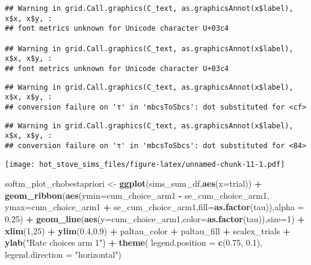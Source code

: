 \documentclass[
]{article}
\newenvironment{Shaded}{\begin{snugshade}}{\end{snugshade}}
\newcommand{\AttributeTok}[1]{\textcolor[rgb]{0.13,0.29,0.53}{#1}}
\newcommand{\DecValTok}[1]{\textcolor[rgb]{0.00,0.00,0.81}{#1}}
\newcommand{\FloatTok}[1]{\textcolor[rgb]{0.00,0.00,0.81}{#1}}
\newcommand{\FunctionTok}[1]{\textcolor[rgb]{0.13,0.29,0.53}{\textbf{#1}}}
\newcommand{\NormalTok}[1]{#1}
\newcommand{\OtherTok}[1]{\textcolor[rgb]{0.56,0.35,0.01}{#1}}
\newcommand{\SpecialCharTok}[1]{\textcolor[rgb]{0.81,0.36,0.00}{\textbf{#1}}}
\newcommand{\StringTok}[1]{\textcolor[rgb]{0.31,0.60,0.02}{#1}}
\begin{document}
\begin{verbatim}
## Warning in grid.Call.graphics(C_text, as.graphicsAnnot(x$label), x$x, x$y, :
## font metrics unknown for Unicode character U+03c4

## Warning in grid.Call.graphics(C_text, as.graphicsAnnot(x$label), x$x, x$y, :
## font metrics unknown for Unicode character U+03c4
\end{verbatim}

\begin{verbatim}
## Warning in grid.Call.graphics(C_text, as.graphicsAnnot(x$label), x$x, x$y, :
## conversion failure on 'τ' in 'mbcsToSbcs': dot substituted for <cf>
\end{verbatim}

\begin{verbatim}
## Warning in grid.Call.graphics(C_text, as.graphicsAnnot(x$label), x$x, x$y, :
## conversion failure on 'τ' in 'mbcsToSbcs': dot substituted for <84>
\end{verbatim}

\texttt{[image: hot\_stove\_sims\_files/figure-latex/unnamed-chunk-11-1.pdf]}

\begin{Shaded}
\begin{Highlighting}[]
\NormalTok{softm\_plot\_chobestapriori }\OtherTok{\textless{}{-}} \FunctionTok{ggplot}\NormalTok{(sims\_sum\_df,}\FunctionTok{aes}\NormalTok{(}\AttributeTok{x=}\NormalTok{trial)) }\SpecialCharTok{+}
  \FunctionTok{geom\_ribbon}\NormalTok{(}\FunctionTok{aes}\NormalTok{(}\AttributeTok{ymin=}\NormalTok{cum\_choice\_arm1 }\SpecialCharTok{{-}}\NormalTok{ se\_cum\_choice\_arm1, }\AttributeTok{ymax=}\NormalTok{cum\_choice\_arm1 }\SpecialCharTok{+}\NormalTok{ se\_cum\_choice\_arm1,}\AttributeTok{fill=}\FunctionTok{as.factor}\NormalTok{(tau)),}\AttributeTok{alpha =} \FloatTok{0.25}\NormalTok{) }\SpecialCharTok{+}
  \FunctionTok{geom\_line}\NormalTok{(}\FunctionTok{aes}\NormalTok{(}\AttributeTok{y=}\NormalTok{cum\_choice\_arm1,}\AttributeTok{color=}\FunctionTok{as.factor}\NormalTok{(tau)),}\AttributeTok{size=}\DecValTok{1}\NormalTok{) }\SpecialCharTok{+} 
  \FunctionTok{xlim}\NormalTok{(}\DecValTok{1}\NormalTok{,}\DecValTok{25}\NormalTok{) }\SpecialCharTok{+}
  \FunctionTok{ylim}\NormalTok{(}\FloatTok{0.4}\NormalTok{,}\FloatTok{0.9}\NormalTok{) }\SpecialCharTok{+} 
\NormalTok{  paltau\_color }\SpecialCharTok{+} 
\NormalTok{  paltau\_fill }\SpecialCharTok{+} 
\NormalTok{  scalex\_trials }\SpecialCharTok{+}
  \FunctionTok{ylab}\NormalTok{(}\StringTok{"Rate choices arm 1"}\NormalTok{) }\SpecialCharTok{+}
  \FunctionTok{theme}\NormalTok{(}
    \AttributeTok{legend.position =} \FunctionTok{c}\NormalTok{(}\FloatTok{0.75}\NormalTok{, }\FloatTok{0.1}\NormalTok{),}
    \AttributeTok{legend.direction =} \StringTok{"horizontal"}\NormalTok{)}
\end{Highlighting}
\end{Shaded}
\end{document}
